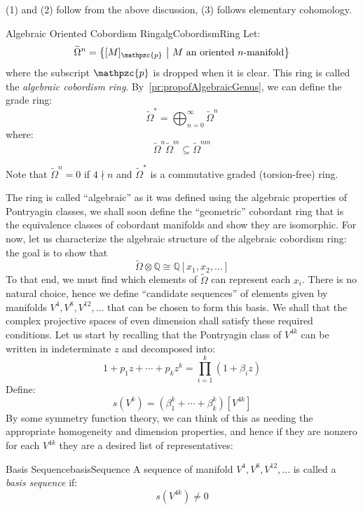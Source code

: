 \documentclass{book}
\newenvironment{Proof}[1][]
  {\begin{ProofTcb}[#1]}
  {\end{ProofTcb}}
\newcommand{\Q}{{\mathbb{Q}}}
\newcommand{\cp}{{\mathpzc{p}}}
\newcommand{\sse}{\subseteq}
\newcommand{\set}[2]{\left\{#1 \ \middle|\ #2\right\}}
\begin{document}
\begin{Proof}
  (1) and (2) follow from the above discussion, (3) follows elementary cohomology.
\end{Proof}


\begin{defn}{Algebraic Oriented Cobordism Ring}{algCobordismRing}
  Let:
  \[
    \widetilde{\Omega}^n = \set{[M]_\cp}{\text{$M$ an oriented $n$-manifold}}
  \]
  where the subscript $\cp$ is dropped when it is clear. This ring is called the \emph{algebraic cobordism
  ring}. By~\cref{pr:propofAlgebraicGenus}, we can define the
  grade ring:
  \[
    \widetilde{\Omega}^* = \bigoplus_{n=0}^\infty \widetilde{\Omega}^n
  \]
  where:
  \[
    \widetilde{\Omega}^n \widetilde{\Omega}^m \sse \widetilde{\Omega}^{nm}
  \]
\end{defn}

Note that $\widetilde{\Omega}^n = 0$ if $4\nmid n$ and $\widetilde{\Omega}^*$ is a commutative graded (torsion-free)
ring.

The ring is called ``algebraic'' as it was defined using the algebraic properties of Pontryagin classes, we
shall soon define the ``geometric'' cobordant ring that is the equivalence classes of cobordant manifolds and
show they are isomorphic. For now, let us characterize the algebraic structure of the algebraic cobordism
ring: the goal is to show that
\[
  \widetilde{\Omega}\otimes \Q \cong \Q[x_1, x_2, ...]
\]
To that end, we must find which elements of $\widetilde{\Omega}$ can represent each $x_i$. There is no natural
choice, hence we define ``candidate sequences'' of elements given by manifolds $V^4, V^8, V^{12}, ...$ that
can be chosen to form this basis. We shall that the complex projective spaces of even
dimension shall satisfy these required conditions. Let us start by recalling that the Pontryagin class of $V^{4k}$ can be written in indeterminate $z$
and decomposed into:
\[
  1 + p_1z + \cdots + p_kz^k = \prod_{i=1}^k (1 + \beta_iz)
\]
Define:
\[
  s(V^k) = (\beta_1^k + \cdots + \beta_k^k)[V^{4k}]
\]
By some symmetry function theory, we can think of this as needing the appropriate homogeneity and dimension
properties, and hence if they are nonzero for each $V^{4k}$ they are a desired list of representatives:
\begin{defn}{Basis Sequence}{basisSequence}
  A sequence of manifold $V^4, V^8, V^{12}, ...$ is called a \emph{basis sequence} if:
  \[
    s(V^{4k}) \ne 0
  \]
\end{defn}
\end{document}
